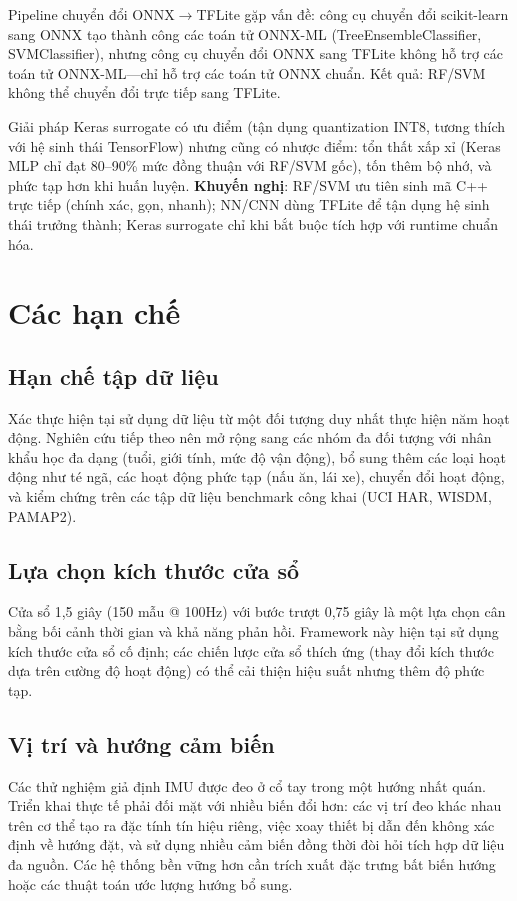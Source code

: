Pipeline chuyển đổi ONNX$\rightarrow$TFLite gặp vấn đề: công cụ chuyển đổi scikit-learn sang ONNX tạo thành công các toán tử ONNX-ML (TreeEnsembleClassifier, SVMClassifier), nhưng công cụ chuyển đổi ONNX sang TFLite không hỗ trợ các toán tử ONNX-ML---chỉ hỗ trợ các toán tử ONNX chuẩn. Kết quả: RF/SVM không thể chuyển đổi trực tiếp sang TFLite.

Giải pháp Keras surrogate có ưu điểm (tận dụng quantization INT8, tương thích với hệ sinh thái TensorFlow) nhưng cũng có nhược điểm: tổn thất xấp xỉ (Keras MLP chỉ đạt 80--90\% mức đồng thuận với RF/SVM gốc), tốn thêm bộ nhớ, và phức tạp hơn khi huấn luyện. \textbf{Khuyến nghị}: RF/SVM ưu tiên sinh mã C++ trực tiếp (chính xác, gọn, nhanh); NN/CNN dùng TFLite để tận dụng hệ sinh thái trưởng thành; Keras surrogate chỉ khi bắt buộc tích hợp với runtime chuẩn hóa.

\section{Các hạn chế}

\subsection{Hạn chế tập dữ liệu}
Xác thực hiện tại sử dụng dữ liệu từ một đối tượng duy nhất thực hiện năm hoạt động. Nghiên cứu tiếp theo nên mở rộng sang các nhóm đa đối tượng với nhân khẩu học đa dạng (tuổi, giới tính, mức độ vận động), bổ sung thêm các loại hoạt động như té ngã, các hoạt động phức tạp (nấu ăn, lái xe), chuyển đổi hoạt động, và kiểm chứng trên các tập dữ liệu benchmark công khai (UCI HAR, WISDM, PAMAP2).

\subsection{Lựa chọn kích thước cửa sổ}
Cửa sổ 1,5 giây (150 mẫu @ 100Hz) với bước trượt 0,75 giây là một lựa chọn cân bằng bối cảnh thời gian và khả năng phản hồi. Framework này hiện tại sử dụng kích thước cửa sổ cố định; các chiến lược cửa sổ thích ứng (thay đổi kích thước dựa trên cường độ hoạt động) có thể cải thiện hiệu suất nhưng thêm độ phức tạp.

\subsection{Vị trí và hướng cảm biến}
Các thử nghiệm giả định IMU được đeo ở cổ tay trong một hướng nhất quán. Triển khai thực tế phải đối mặt với nhiều biến đổi hơn: các vị trí đeo khác nhau trên cơ thể tạo ra đặc tính tín hiệu riêng, việc xoay thiết bị dẫn đến không xác định về hướng đặt, và sử dụng nhiều cảm biến đồng thời đòi hỏi tích hợp dữ liệu đa nguồn. Các hệ thống bền vững hơn cần trích xuất đặc trưng bất biến hướng hoặc các thuật toán ước lượng hướng bổ sung.

